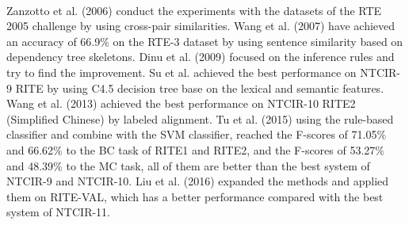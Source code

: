 \documentclass[12pt]{article}
\begin{document}
\begin{CJK*}{UTF8}{bkai}
\begin{spacing}{1.77}
\paragraph{}
Zanzotto et al. (2006)\cite{zanzotto_moschitti_2006} conduct the experiments with the datasets of the RTE 2005 challenge by using cross-pair similarities. Wang et al. (2007) have achieved an accuracy of 66.9\% on the RTE-3 dataset by using sentence similarity based on dependency tree skeletons. Dinu et al. (2009)\cite{dinu_wang_2009} focused on the inference rules and try to find the improvement. Su et al.\cite{su_zheng_2011} achieved the best performance on NTCIR-9 RITE by using C4.5 decision tree base on the lexical and semantic features. Wang et al. (2013)\cite{wang-etal-2013-labeled} achieved the best performance on NTCIR-10 RITE2 (Simplified Chinese) by labeled alignment. Tu et al. (2015)\cite{tu_2015} using the rule-based classifier and combine with the SVM classifier, reached the F-scores of 71.05\% and 66.62\% to the BC task of RITE1 and RITE2, and the F-scores of 53.27\% and 48.39\% to the MC task, all of them are better than the best system of NTCIR-9 and NTCIR-10. Liu et al. (2016)\cite{liu_2016} expanded the methods and applied them on RITE-VAL, which has a better performance compared with the best system of NTCIR-11.


\end{spacing}
\end{CJK*}
\end{document}
